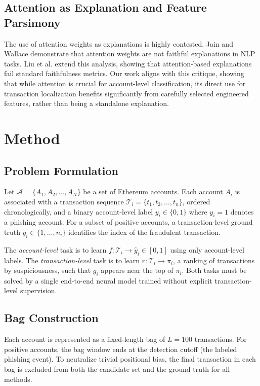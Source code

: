\documentclass[conference]{IEEEtran}
\begin{document}
\subsection{Attention as Explanation and Feature Parsimony}
The use of attention weights as explanations is highly contested. Jain and Wallace \cite{jain2019} demonstrate that attention weights are not faithful explanations in NLP tasks. Liu et al. \cite{liu2022} extend this analysis, showing that attention-based explanations fail standard faithfulness metrics. Our work aligns with this critique, showing that while attention is crucial for account-level classification, its direct use for transaction localization benefits significantly from carefully selected engineered features, rather than being a standalone explanation.

\section{Method}

\subsection{Problem Formulation}
Let $\mathcal{A} = \{A_1, A_2, \ldots, A_N\}$ be a set of Ethereum accounts. Each account $A_i$ is associated with a transaction sequence $\mathcal{T}_i = \{t_1, t_2, \ldots, t_n\}$, ordered chronologically, and a binary account-level label $y_i \in \{0, 1\}$ where $y_i=1$ denotes a phishing account. For a subset of positive accounts, a transaction-level ground truth $g_i \in \{1, \ldots, n_i\}$ identifies the index of the fraudulent transaction.

The \emph{account-level} task is to learn $f : \mathcal{T}_i \rightarrow \hat{y}_i \in [0, 1]$ using only account-level labels. The \emph{transaction-level} task is to learn $r : \mathcal{T}_i \rightarrow \pi_i$, a ranking of transactions by suspiciousness, such that $g_i$ appears near the top of $\pi_i$. Both tasks must be solved by a single end-to-end neural model trained without explicit transaction-level supervision.

\subsection{Bag Construction}
Each account is represented as a fixed-length bag of $L=100$ transactions. For positive accounts, the bag window ends at the detection cutoff (the labeled phishing event). To neutralize trivial positional bias, the final transaction in each bag is excluded from both the candidate set and the ground truth for all methods.
\end{document}
